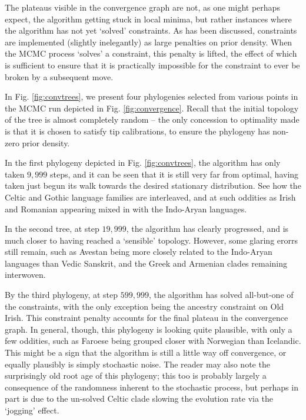 \documentclass[10pt,journal,compsoc]{IEEEtran}
\begin{document}
The plateaus visible in the convergence graph are not, as one might perhaps expect, the algorithm getting stuck in local minima, but rather instances where the algorithm has not yet `solved' constraints. As has been discussed, constraints are implemented (slightly inelegantly) as large penalties on prior density. When the MCMC process `solves' a constraint, this penalty is lifted, the effect of which is sufficient to ensure that it is practically impossible for the constraint to ever be broken by a subsequent move.

In Fig. \ref{fig:convtrees}, we present four phylogenies selected from various points in the MCMC run depicted in Fig. \ref{fig:convergence}. Recall that the initial topology of the tree is almost completely random -- the only concession to optimality made is that it is chosen to satisfy tip calibrations, to ensure the phylogeny has non-zero prior density.

In the first phylogeny depicted in Fig. \ref{fig:convtrees}, the algorithm has only taken $9,999$ steps, and it can be seen that it is still very far from optimal, having taken just begun its walk towards the desired stationary distribution. See how the Celtic and Gothic language families are interleaved, and at such oddities as Irish and Romanian appearing mixed in with the Indo-Aryan languages.

In the second tree, at step $19,999$, the algorithm has clearly progressed, and is much closer to having reached a `sensible' topology. However, some glaring erorrs still remain, such as Avestan being more closely related to the Indo-Aryan languages than Vedic Sanskrit, and the Greek and Armenian clades remaining interwoven.

By the third phylogeny, at step $599,999$, the algorithm has solved all-but-one of the constraints, with the only exception being the ancestry constraint on Old Irish. This constraint penalty accounts for the final plateau in the convergence graph. In general, though, this phylogeny is looking quite plausible, with only a few oddities, such as Faroese being grouped closer with Norwegian than Icelandic. This might be a sign that the algorithm is still a little way off convergence, or equally plausibly is simply stochastic noise. The reader may also note the surprisingly old root age of this phylogeny; this too is probably largely a consequence of the randomness inherent to the stochastic process, but perhaps in part is due to the un-solved Celtic clade slowing the evolution rate via the `jogging' effect.
\end{document}
